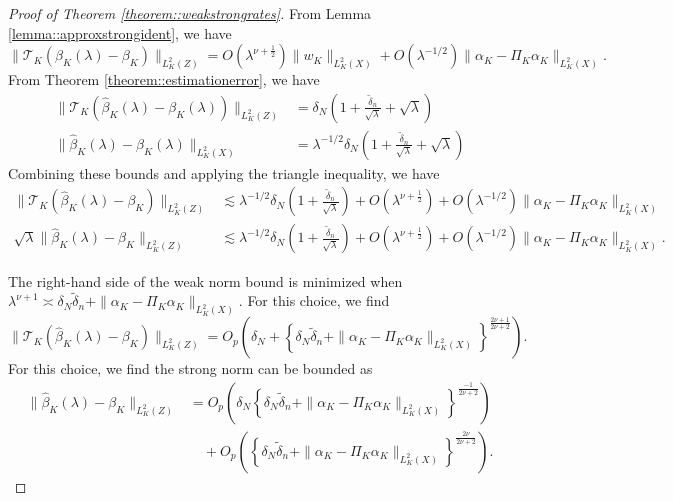 \documentclass[11pt]{article}
\theoremstyle{plain}
\theoremstyle{definition}
\theoremstyle{remark}
\theoremstyle{definition}
\begin{document}
\begin{proof}[Proof of Theorem  \ref{theorem::weakstrongrates}]
    From Lemma \ref{lemma::approxstrongident}, we  have
    \[
    \|\mathcal{T}_{K}(\beta_{K}(\lambda) - \beta_{K}) \|_{L^2_K(Z)} = O(\lambda^{\nu + \frac{1}{2}}) \|w_{K}\|_{L^2_K(X)} + O(\lambda^{-1/2}) \|\alpha_K - \Pi_{K} \alpha_K\|_{L^2_K(X)}.
    \] 
    From Theorem \ref{theorem::estimationerror}, we have
    \begin{align*}
\|\mathcal{T}_{K}(\widehat{\beta}_K(\lambda)-\beta_{K}(\lambda))\|_{L^2_K(Z)}& = \delta_N \left( 1 + \frac{\widetilde{\delta}_n}{\sqrt{\lambda}}  + \sqrt{\lambda} \right)\\
\|\widehat{\beta}_K(\lambda)-\beta_{K}(\lambda)\|_{L^2_K(X)} &= \lambda^{-1/2} \delta_N \left( 1 + \frac{\widetilde{\delta}_n}{\sqrt{\lambda}}  + \sqrt{\lambda} \right)
\end{align*} 
Combining these bounds and applying the triangle inequality, we have
\begin{align*}
      \|\mathcal{T}_{K}(\widehat{\beta}_K(\lambda)-\beta_{K}) \|_{L^2_K(Z)} 
      &\lesssim \lambda^{-1/2} \delta_N \left( 1 + \frac{\widetilde{\delta}_n}{\sqrt{\lambda}} \right) 
      +  O(\lambda^{\nu + \frac{1}{2}}) 
      + O(\lambda^{-1/2}) \|\alpha_K - \Pi_{K} \alpha_K\|_{L^2_K(X)} \\
       \sqrt{\lambda}  \|\widehat{\beta}_K(\lambda)-\beta_{K}\|_{L^2_K(Z)} 
       &\lesssim \lambda^{-1/2} \delta_N \left( 1 + \frac{\widetilde{\delta}_n}{\sqrt{\lambda}} \right) 
       +  O(\lambda^{\nu + \frac{1}{2}}) 
       + O(\lambda^{-1/2}) \|\alpha_K - \Pi_{K} \alpha_K\|_{L^2_K(X)}.
\end{align*}

The right-hand side of the weak norm bound is minimized when \( \lambda^{\nu + 1} \asymp \delta_N \widetilde{\delta}_n + \|\alpha_K - \Pi_{K} \alpha_K\|_{L^2_K(X)}\). For this choice, we find
 $$\|\mathcal{T}_{K}(\widehat{\beta}_K(\lambda) -  \beta_{K})\|_{L^2_K(Z)} = O_p\left(\delta_N + \left\{ \delta_N \widetilde{\delta}_n + \|\alpha_K - \Pi_{K} \alpha_K\|_{L^2_K(X)} \right\}^{\frac{2\nu +1}{2\nu +2}}\right).$$
 For this choice, we find the strong norm can be bounded as 
 \begin{align*}
     \|\widehat{\beta}_K(\lambda) -  \beta_{K}\|_{L^2_K(Z)} &= O_p\left(\delta_N\left\{ \delta_N \widetilde{\delta}_n + \|\alpha_K - \Pi_{K} \alpha_K\|_{L^2_K(X)} \right\}^{\frac{-1}{2\nu +2}} \right) \\
     & \quad + O_p\left(\left\{ \delta_N \widetilde{\delta}_n + \|\alpha_K - \Pi_{K} \alpha_K\|_{L^2_K(X)} \right\}^{\frac{2\nu}{2\nu +2}}\right).
 \end{align*} 
\end{proof}
\end{document}
